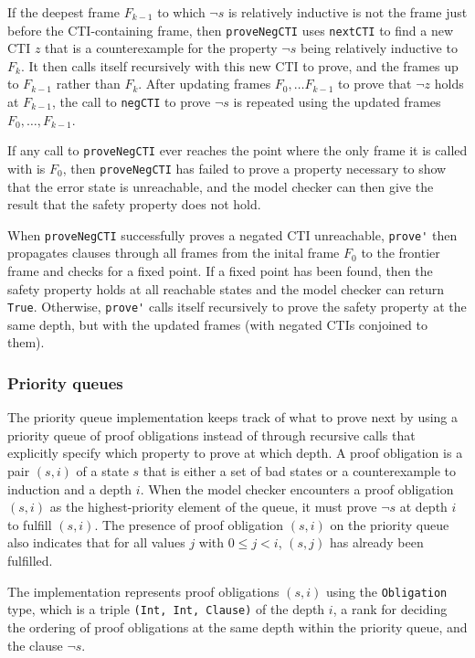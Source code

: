 \documentclass[12pt,a4paper,twoside,openright]{report}
\begin{document}
If the deepest frame $F_{k - 1}$ to which $\neg s$ is relatively inductive is not the frame just before
the CTI-containing frame, then \verb,proveNegCTI, uses \verb,nextCTI, to find a new CTI $z$
that is a counterexample for the property $\neg s$ being relatively inductive to $F_k$. It then
calls itself recursively with this new CTI to prove, and the frames up to $F_{k - 1}$ rather than
$F_k$. After updating frames $F_0, \ldots F_{k - 1}$ to prove that $\neg z$ holds at $F_{k - 1}$,
the call to \verb,negCTI, to prove $\neg s$ is repeated using the updated frames $F_0, \ldots, F_{k - 1}$.

If any call to \verb,proveNegCTI, ever reaches the point where the only frame it is called with is
$F_0$, then \verb,proveNegCTI, has failed to prove a property necessary to show that the error
state is unreachable, and the model checker can then give the result that the safety property
does not hold.

When \verb,proveNegCTI, successfully proves a negated CTI unreachable, \verb,prove', then propagates
clauses through all frames from the inital frame $F_0$ to the frontier frame and checks for a fixed
point. If a fixed point has been found, then the safety property holds at all reachable states and the
model checker can return \verb,True,. Otherwise, \verb,prove', calls itself recursively to prove
the safety property at the same depth, but with the updated frames (with negated CTIs conjoined
to them).

\subsubsection{Priority queues}

The priority queue implementation keeps track of what to prove next by using a priority queue of proof
obligations instead of through recursive calls that explicitly specify which property to prove at
which depth. A proof obligation is a pair $(s,i)$ of a state $s$ that is either a set of bad states
or a counterexample to induction and a depth $i$. When the model checker encounters a proof obligation
$(s,i)$ as the highest-priority element of the queue, it must prove $\neg s$ at depth $i$ to fulfill
$(s, i)$.
The presence of proof obligation $(s,i)$ on the priority queue also indicates that for all values $j$
with $0 \leq j < i$, $(s, j)$ has already been fulfilled.

The implementation represents proof obligations $(s,i)$ using the \verb,Obligation, type, which
is a triple \verb.(Int, Int, Clause). of the depth $i$, a rank for deciding the ordering of
proof obligations at the same depth within the priority queue, and the clause $\neg s$.
\end{document}
